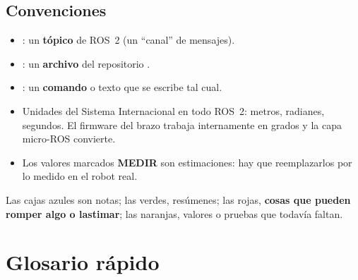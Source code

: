 \subsection*{Convenciones}
\begin{itemize}
  \item {}: un \textbf{tópico} de ROS~2 (un ``canal'' de mensajes).
  \item {}: un \textbf{archivo} del repositorio .
  \item {}: un \textbf{comando} o texto que se escribe tal cual.
  \item Unidades del Sistema Internacional en todo ROS~2: metros, radianes, segundos. El firmware del brazo trabaja
        internamente en grados y la capa micro-ROS convierte.
  \item Los valores marcados \textbf{MEDIR} son estimaciones: hay que reemplazarlos por lo medido en el robot real.
\end{itemize}

\begin{nota}
Las cajas azules son notas; las verdes, resúmenes; las rojas, \textbf{cosas que pueden romper algo o lastimar}; las
naranjas, valores o pruebas que todavía faltan.
\end{nota}

\section{Glosario rápido}

